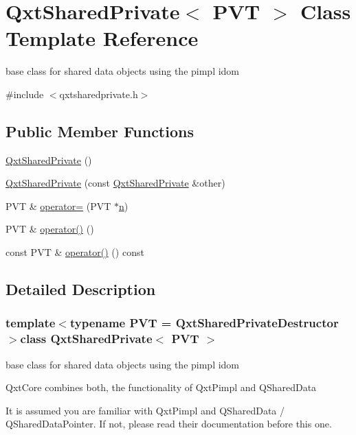 \hypertarget{class_qxt_shared_private}{\section{Qxt\-Shared\-Private$<$ P\-V\-T $>$ Class Template Reference}
\label{class_qxt_shared_private}
}


base class for shared data objects using the pimpl idom  




{\ttfamily \#include $<$qxtsharedprivate.\-h$>$}

\subsection*{Public Member Functions}
\begin{DoxyCompactItemize}
\item 
\hyperlink{class_qxt_shared_private_a510eacaacc3d2e03d6700ef508c68439}{Qxt\-Shared\-Private} ()
\item 
\hyperlink{class_qxt_shared_private_a1adeeb709bc388bfe4b0e2cef7c68d4f}{Qxt\-Shared\-Private} (const \hyperlink{class_qxt_shared_private}{Qxt\-Shared\-Private} \&other)
\item 
P\-V\-T \& \hyperlink{class_qxt_shared_private_af5fa87ca5f85b4c07a245f5f2f60d613}{operator=} (P\-V\-T $\ast$\hyperlink{glext_8h_a4eacae1d9e7c39f8236bb36d4ececa77}{n})
\item 
P\-V\-T \& \hyperlink{class_qxt_shared_private_a78fe54903459c778d1c66ea8fbac0f34}{operator()} ()
\item 
const P\-V\-T \& \hyperlink{class_qxt_shared_private_afeecd8a6a40e52c3590f9d7feee425bd}{operator()} () const 
\end{DoxyCompactItemize}


\subsection{Detailed Description}
\subsubsection*{template$<$typename P\-V\-T = Qxt\-Shared\-Private\-Destructor$>$class Qxt\-Shared\-Private$<$ P\-V\-T $>$}

base class for shared data objects using the pimpl idom 

Qxt\-Core combines both, the functionality of Qxt\-Pimpl and Q\-Shared\-Data \par
 It is assumed you are familiar with Qxt\-Pimpl and Q\-Shared\-Data / Q\-Shared\-Data\-Pointer. If not, please read their documentation before this one. \par


